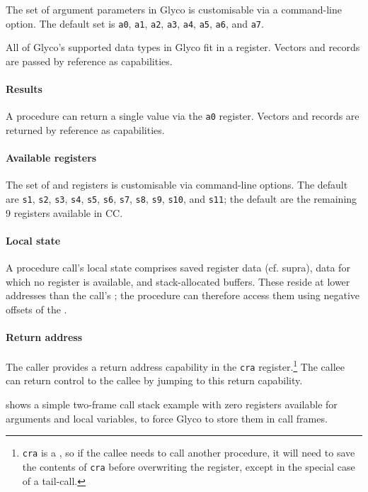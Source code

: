 \documentclass[main.tex]{subfiles}
\begin{document}
The set of argument parameters in Glyco is customisable via a command-line option. The default set is \texttt{a0}, \texttt{a1}, \texttt{a2}, \texttt{a3}, \texttt{a4}, \texttt{a5}, \texttt{a6}, and \texttt{a7}.

All of Glyco's supported data types in Glyco fit in a register. Vectors and records are passed by reference as capabilities.

\paragraph{Results} A procedure can return a single value via the \texttt{a0} register. Vectors and records are returned by reference as capabilities.

\paragraph{Available registers} The set of  and  registers is customisable via command-line options. The default  are \texttt{s1}, \texttt{s2}, \texttt{s3}, \texttt{s4}, \texttt{s5}, \texttt{s6}, \texttt{s7}, \texttt{s8}, \texttt{s9}, \texttt{s10}, and \texttt{s11}; the default  are the remaining 9 registers available in CC.

\paragraph{Local state} A procedure call's local state comprises saved register data (cf. supra), data for which no register is available, and stack-allocated buffers. These reside at lower addresses than the call's ; the procedure can therefore access them using negative offsets of the .

\paragraph{Return address} The caller provides a return address capability in the \texttt{cra} register.\footnote{\texttt{cra} is a , so if the callee needs to call another procedure, it will need to save the contents of \texttt{cra} before overwriting the register, except in the special case of a tail-call.} The callee can return control to the callee by jumping to this return capability.

 shows a simple two-frame call stack example with zero registers available for arguments and local variables, to force Glyco to store them in call frames.
\end{document}
